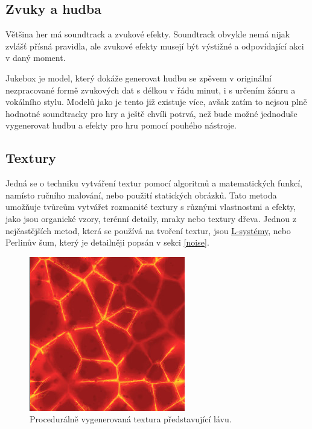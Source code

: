 \subsection{Zvuky a hudba}
Většina her má soundtrack a zvukové efekty. Soundtrack obvykle nemá nijak zvlášť přísná pravidla, ale zvukové efekty musejí být výstižné a odpovídající akci v daný moment. 

Jukebox \cite{Dhariwal2020JukeboxAG} je model, který dokáže generovat hudbu se zpěvem v originální nezpracované formě zvukových dat s délkou v řádu minut, i s určením žánru a vokálního stylu. Modelů jako je tento již existuje více, avšak zatím to nejsou plně hodnotné soundtracky pro hry a ještě chvíli potrvá, než bude možné jednoduše vygenerovat hudbu a efekty pro hru pomocí pouhého nástroje.

\newpage

\subsection{Textury}
Jedná se o techniku vytváření textur pomocí algoritmů a matematických funkcí, namísto ručního malování, nebo použití statických obrázků. Tato metoda umožňuje tvůrcům vytvářet rozmanité textury s různými vlastnostmi a efekty, jako jsou organické vzory, terénní detaily, mraky nebo textury dřeva. Jednou z nejčastějších metod, která se používá na tvoření textur, jsou \hyperref[lsystems]{L-systémy}, nebo Perlinův šum, který je detailněji popsán v sekci \ref{noise}.

\begin{figure}[H]
	\centering
	\includegraphics[scale=1]{obrazky-figures/ProceduralTexture.png}
	\caption{Procedurálně vygenerovaná textura představující lávu.}
	\label{proceduralTexture}
\end{figure}

\newpage

